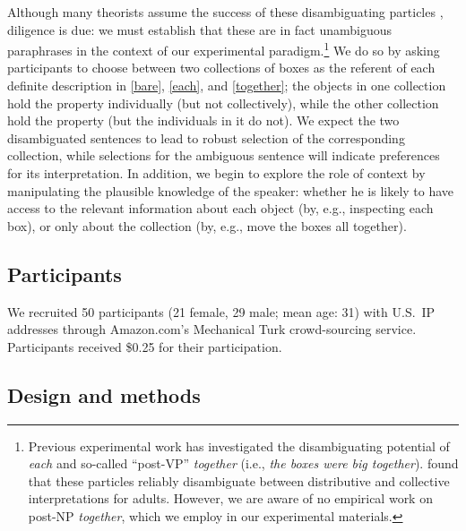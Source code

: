 \documentclass[preprint,12pt,authoryear,titlepage]{elsarticle}
\begin{document}
Although many theorists assume the success of these disambiguating particles \citep[e.g.,][]{schwarzschild1994}, diligence is due: we must establish that these are in fact unambiguous paraphrases in the context of our experimental paradigm.\footnote{Previous experimental work has investigated the disambiguating potential of \emph{each} and so-called ``post-VP'' \emph{together} (i.e., \emph{the boxes were big together}). \citet{syrettmusolino2013,syrettmusolino2016} found that these particles reliably disambiguate between distributive and collective interpretations for adults. However, we are aware of no empirical work on post-NP \emph{together}, which we employ in our experimental materials.} We do so by asking participants to choose between two collections of boxes as the referent of each definite description in \ref{bare}, \ref{each}, and \ref{together}; the objects in one collection hold the property individually (but not collectively), while the other collection hold the property (but the individuals in it do not).
We expect the two disambiguated sentences to lead to robust selection of the corresponding collection, while selections for the ambiguous sentence will indicate preferences for its interpretation.
In addition, we begin to explore the role of context by manipulating the plausible knowledge of the speaker: whether he is likely to have access to the relevant information about each object (by, e.g., inspecting each box), or only about the collection (by, e.g., move the boxes all together).

\subsection{Participants}

We recruited 50 participants (21 female, 29 male; mean age: 31) with U.S.~IP addresses through Amazon.com's Mechanical Turk crowd-sourcing service. Participants received \$0.25 for their participation. 


\subsection{Design and methods}
\end{document}
